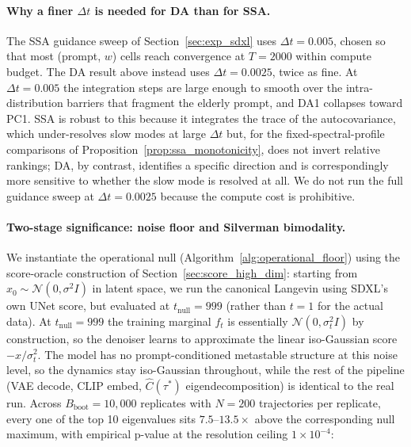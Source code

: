 \documentclass{article}
\begin{document}
\paragraph{Why a finer $\Delta t$ is needed for DA than for SSA.}
The SSA guidance sweep of Section~\ref{sec:exp_sdxl} uses
$\Delta t = 0.005$, chosen so that most (prompt, $w$) cells reach
convergence at $T = 2000$ within compute budget. The DA result
above instead uses $\Delta t = 0.0025$, twice as fine. At
$\Delta t = 0.005$ the integration steps are large enough to
smooth over the intra-distribution barriers that fragment the
elderly prompt, and DA1 collapses toward PC1. SSA is robust to
this because it integrates the trace of the autocovariance, which
under-resolves slow modes at large $\Delta t$ but, for the
fixed-spectral-profile comparisons of Proposition~\ref{prop:ssa_monotonicity}, does not invert relative rankings; DA, by contrast,
identifies a specific direction and is correspondingly more
sensitive to whether the slow mode is resolved at all. We do not
run the full guidance sweep at $\Delta t = 0.0025$ because the
compute cost is prohibitive.


\paragraph{Two-stage significance: noise floor and Silverman bimodality.}
We instantiate the operational null
(Algorithm~\ref{alg:operational_floor}) using the score-oracle
construction of Section~\ref{sec:score_high_dim}: starting from
$x_0 \sim \mathcal{N}(0, \sigma^2 I)$ in latent space, we run the
canonical Langevin using SDXL's own UNet score, but evaluated at
$t_{\mathrm{null}} = 999$ (rather than $t = 1$ for the actual
data). At $t_{\mathrm{null}} = 999$ the training marginal $f_t$ is
essentially $\mathcal{N}(0, \sigma_t^2 I)$ by construction, so the
denoiser learns to approximate the linear iso-Gaussian score
$-x/\sigma_t^2$. The model has no prompt-conditioned metastable
structure at this noise level, so the dynamics stay iso-Gaussian
throughout, while the rest of the pipeline (VAE decode, CLIP
embed, $\hat C(\tau^*)$ eigendecomposition) is identical to the
real run. Across $B_{\mathrm{boot}} = 10{,}000$ replicates with
$N = 200$ trajectories per replicate, every one of the top 10
eigenvalues sits $7.5\text{--}13.5\times$ above the corresponding
null maximum, with empirical p-value at the resolution ceiling
$1 \times 10^{-4}$:
\end{document}
